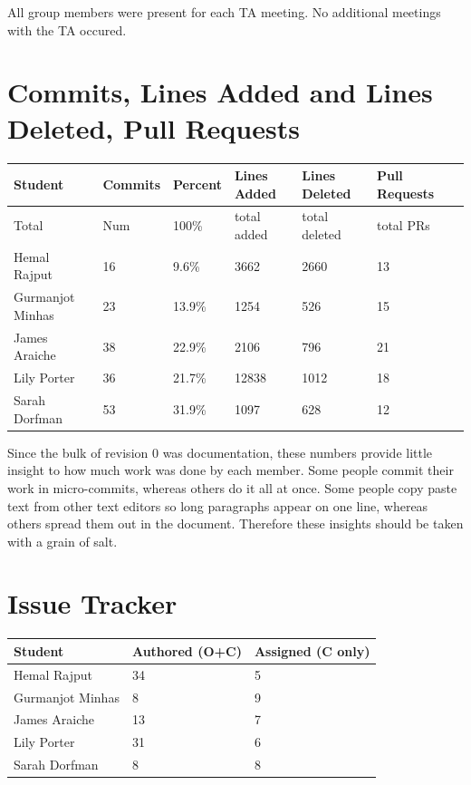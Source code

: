 \documentclass{article}
\begin{document}
All group members were present for each TA meeting. 
No additional meetings with the TA occured. 

\section{Commits, Lines Added and Lines Deleted, Pull Requests}

\begin{table}[H]
\centering
\begin{tabular}{lllllll}
\toprule
\textbf{Student} & \textbf{Commits} & \textbf{Percent} & \textbf{Lines Added} &
\textbf{Lines Deleted} & \textbf{Pull Requests}\\
\midrule
Total & Num & 100\% & total added & total deleted & total PRs\\
Hemal Rajput & 16 & 9.6\% & 3662 & 2660 & 13\\
Gurmanjot Minhas & 23 & 13.9\% & 1254 & 526 & 15\\
James Araiche & 38 & 22.9\% & 2106 & 796 & 21\\
Lily Porter & 36 & 21.7\% & 12838 & 1012 & 18\\
Sarah Dorfman & 53 & 31.9\% & 1097 & 628 & 12\\
\bottomrule
\end{tabular}
\end{table}

Since the bulk of revision 0 was documentation, these numbers provide
little insight to how much work was done by each member. Some people commit
their work in micro-commits, whereas others do it all at once. Some people copy
paste text from other text editors so long paragraphs appear on one line, whereas
others spread them out in the document. Therefore these insights should be taken 
with a grain of salt.  

\section{Issue Tracker}

\begin{table}[H]
\centering
\begin{tabular}{lll}
\toprule
\textbf{Student} & \textbf{Authored (O+C)} & \textbf{Assigned (C only)}\\
\midrule
Hemal Rajput & 34 & 5 \\
Gurmanjot Minhas & 8 & 9 \\
James Araiche & 13 & 7 \\
Lily Porter & 31 & 6 \\
Sarah Dorfman & 8 & 8 \\
\bottomrule
\end{tabular}
\end{table}
\end{document}
